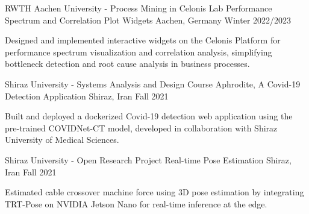 

\begin{cventries}

  \cventry
    {RWTH Aachen University - Process Mining in Celonis Lab} %
    {Performance Spectrum and Correlation Plot Widgets} %
    {Aachen, Germany} %
    {Winter 2022/2023} %
    {
      \begin{cvitems} %
        \item {Designed and implemented interactive widgets on the Celonis Platform for performance spectrum visualization and correlation analysis, simplifying bottleneck detection and root cause analysis in business processes.}
      \end{cvitems}
    }

  \cventry
    {Shiraz University - Systems Analysis and Design Course} %
    {Aphrodite, A Covid-19 Detection Application} %
    {Shiraz, Iran} %
    {Fall 2021} %
    {
      \begin{cvitems} %
        \item {Built and deployed a dockerized Covid-19 detection web application using the pre-trained COVIDNet-CT model, developed in collaboration with Shiraz University of Medical Sciences.}
      \end{cvitems}
    }

  \cventry
    {Shiraz University - Open Research Project} %
    {Real-time Pose Estimation} %
    {Shiraz, Iran} %
    {Fall 2021} %
    {
      \begin{cvitems} %
        \item {Estimated cable crossover machine force using 3D pose estimation by integrating TRT-Pose on NVIDIA Jetson Nano for real-time inference at the edge.}
      \end{cvitems}
    }

\end{cventries}
